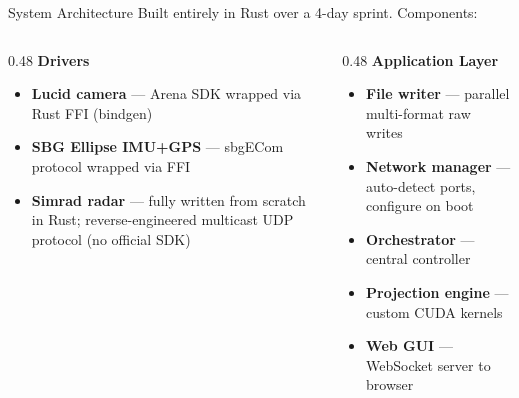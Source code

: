 \documentclass[10pt, aspectratio=169]{beamer}
\begin{document}
\begin{frame}{System Architecture}
  Built entirely in Rust over a 4-day sprint. Components:

  \vspace{0.3em}
  \begin{columns}[T]
    \begin{column}{0.48\textwidth}
      \textbf{Drivers}
      \begin{itemize}
        \item \textbf{Lucid camera} --- Arena SDK wrapped via Rust FFI (bindgen)
        \item \textbf{SBG Ellipse IMU+GPS} --- sbgECom protocol wrapped via FFI
        \item \textbf{Simrad radar} --- fully written from scratch in Rust; reverse-engineered multicast UDP protocol (no official SDK)
      \end{itemize}
    \end{column}
    \begin{column}{0.48\textwidth}
      \textbf{Application Layer}
      \begin{itemize}
        \item \textbf{File writer} --- parallel multi-format raw writes
        \item \textbf{Network manager} --- auto-detect ports, configure on boot
        \item \textbf{Orchestrator} --- central controller
        \item \textbf{Projection engine} --- custom CUDA kernels
        \item \textbf{Web GUI} --- WebSocket server to browser
      \end{itemize}
    \end{column}
  \end{columns}
\end{frame}
\end{document}
